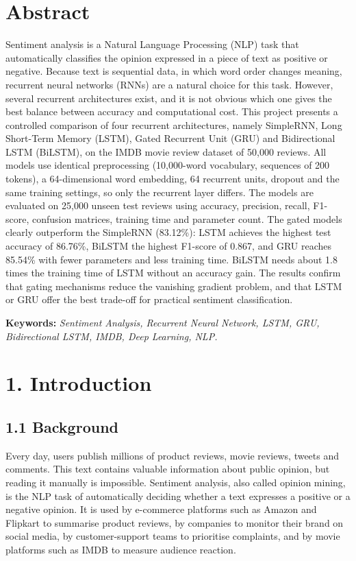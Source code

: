\documentclass[12pt,a4paper,oneside]{report}
\begin{document}
\chapter*{Abstract}
Sentiment analysis is a Natural Language Processing (NLP) task that automatically classifies the opinion expressed in a piece of text as positive or negative. Because text is sequential data, in which word order changes meaning, recurrent neural networks (RNNs) are a natural choice for this task. However, several recurrent architectures exist, and it is not obvious which one gives the best balance between accuracy and computational cost. This project presents a controlled comparison of four recurrent architectures, namely SimpleRNN, Long Short-Term Memory (LSTM), Gated Recurrent Unit (GRU) and Bidirectional LSTM (BiLSTM), on the IMDB movie review dataset of 50,000 reviews. All models use identical preprocessing (10,000-word vocabulary, sequences of 200 tokens), a 64-dimensional word embedding, 64 recurrent units, dropout and the same training settings, so only the recurrent layer differs. The models are evaluated on 25,000 unseen test reviews using accuracy, precision, recall, F1-score, confusion matrices, training time and parameter count. The gated models clearly outperform the SimpleRNN (83.12\%): LSTM achieves the highest test accuracy of 86.76\%, BiLSTM the highest F1-score of 0.867, and GRU reaches 85.54\% with fewer parameters and less training time. BiLSTM needs about 1.8 times the training time of LSTM without an accuracy gain. The results confirm that gating mechanisms reduce the vanishing gradient problem, and that LSTM or GRU offer the best trade-off for practical sentiment classification.

\noindent\textbf{Keywords:} \textit{Sentiment Analysis, Recurrent Neural Network, LSTM, GRU, Bidirectional LSTM, IMDB, Deep Learning, NLP.}

\chapter*{1. Introduction}
\section*{1.1 Background}
Every day, users publish millions of product reviews, movie reviews, tweets and comments. This text contains valuable information about public opinion, but reading it manually is impossible. Sentiment analysis, also called opinion mining, is the NLP task of automatically deciding whether a text expresses a positive or a negative opinion. It is used by e-commerce platforms such as Amazon and Flipkart to summarise product reviews, by companies to monitor their brand on social media, by customer-support teams to prioritise complaints, and by movie platforms such as IMDB to measure audience reaction.
\end{document}
